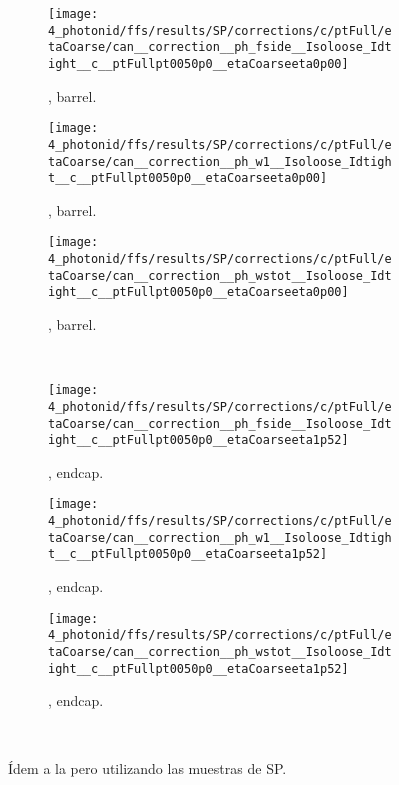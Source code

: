 \begin{figure}[ht!]
    \centering
    \begin{subfigure}[h]{0.32\linewidth}
        \centering
        \texttt{[image: 4\_photonid/ffs/results/SP/corrections/c/ptFull/etaCoarse/can\_\_correction\_\_ph\_fside\_\_Isoloose\_Idtight\_\_c\_\_ptFullpt0050p0\_\_etaCoarseeta0p00]}
        \caption{\fside, barrel.}
    \end{subfigure}
    \hfill
    \begin{subfigure}[h]{0.32\linewidth}
        \centering
        \texttt{[image: 4\_photonid/ffs/results/SP/corrections/c/ptFull/etaCoarse/can\_\_correction\_\_ph\_w1\_\_Isoloose\_Idtight\_\_c\_\_ptFullpt0050p0\_\_etaCoarseeta0p00]}
        \caption{\wone, barrel.}
    \end{subfigure}
    \hfill
    \begin{subfigure}[h]{0.32\linewidth}
        \centering
        \texttt{[image: 4\_photonid/ffs/results/SP/corrections/c/ptFull/etaCoarse/can\_\_correction\_\_ph\_wstot\_\_Isoloose\_Idtight\_\_c\_\_ptFullpt0050p0\_\_etaCoarseeta0p00]}
        \caption{\wstot, barrel.}
    \end{subfigure}\\
    \begin{subfigure}[h]{0.32\linewidth}
        \centering
        \texttt{[image: 4\_photonid/ffs/results/SP/corrections/c/ptFull/etaCoarse/can\_\_correction\_\_ph\_fside\_\_Isoloose\_Idtight\_\_c\_\_ptFullpt0050p0\_\_etaCoarseeta1p52]}
        \caption{\fside, endcap.}
    \end{subfigure}
    \hfill
    \begin{subfigure}[h]{0.32\linewidth}
        \centering
        \texttt{[image: 4\_photonid/ffs/results/SP/corrections/c/ptFull/etaCoarse/can\_\_correction\_\_ph\_w1\_\_Isoloose\_Idtight\_\_c\_\_ptFullpt0050p0\_\_etaCoarseeta1p52]}
        \caption{\wone, endcap.}
    \end{subfigure}
    \hfill
    \begin{subfigure}[h]{0.32\linewidth}
        \centering
        \texttt{[image: 4\_photonid/ffs/results/SP/corrections/c/ptFull/etaCoarse/can\_\_correction\_\_ph\_wstot\_\_Isoloose\_Idtight\_\_c\_\_ptFullpt0050p0\_\_etaCoarseeta1p52]}
        \caption{\wstot, endcap.}
    \end{subfigure}\\
    \caption{Ídem a la \Fig{\ref{fig:ss_corrections:ffs:results:ss_rz}} pero utilizando las muestras de \ac{SP}.}
    \label{fig:ss_corrections:ffs:results:ss_sp}
\end{figure}
























